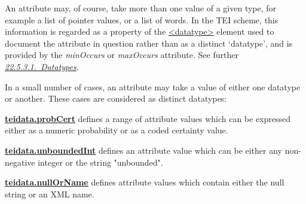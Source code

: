 An attribute may, of course, take more than one value of a given type, for example a list of pointer values, or a list of words. In the TEI scheme, this information is regarded as a property of the \hyperref[TEI.datatype]{<datatype>} element used to document the attribute in question rather than as a distinct ‘datatype’, and is provided by the {\itshape minOccurs} or {\itshape maxOccurs} attribute. See further \textit{\hyperref[TD-datatypes]{22.5.3.1.\ Datatypes}}.\par
In a small number of cases, an attribute may take a value of either one datatype or another. These cases are considered as distinct datatypes: 
\begin{sansreflist}
  
\item {\bfseries \hyperref[TEI.teidata.probCert]{teidata.probCert}} defines a range of attribute values which can be expressed either as a numeric probability or as a coded certainty value.
\item {\bfseries \hyperref[TEI.teidata.unboundedInt]{teidata.unboundedInt}} defines an attribute value which can be either any non-negative integer or the string "unbounded".
\item {\bfseries \hyperref[TEI.teidata.nullOrName]{teidata.nullOrName}} defines attribute values which contain either the null string or an XML name.
\end{sansreflist}

